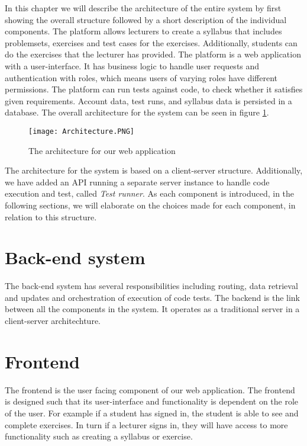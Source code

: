 In this chapter we will describe the architecture of the entire system by first showing the overall structure followed by a short description of the individual components. 
The platform allows lecturers to create a syllabus that includes problemsets, exercises and test cases for the exercises. Additionally, students can do the exercises that the lecturer has provided. 
The platform is a web application with a user-interface. It has business logic to handle user requests and authentication with roles, which means users of varying roles have different permissions. The platform can run tests against code, to check whether it satisfies given requirements. Account data, test runs, and syllabus data is persisted in a database.
The overall architecture for the system can be seen in figure \ref{fig:Architecture}.

\begin{figure}[H]
	\texttt{[image: Architecture.PNG]}
	\centering
	\caption{The architecture for our web application}
	\label{fig:Architecture}
\end{figure}

The architecture for the system is based on a client-server structure. Additionally, we have added an API running a separate server instance to handle code execution and test, called \textit{Test runner}. As each component is introduced, in the following sections, we will elaborate on the choices made for each component, in relation to this structure.

\section{Back-end system}
The back-end system has several responsibilities including routing, data retrieval and updates and orchestration of execution of code tests. The backend is the link between all the components in the system. It operates as a traditional server in a client-server architechture. 

\section{Frontend}
The frontend is the user facing component of our web application. The frontend is designed such that its user-interface and functionality is dependent on the role of the user. 
For example if a student has signed in, the student is able to see and complete exercises. In turn if a lecturer signs in, they will have access to more functionality such as creating a syllabus or exercise.

